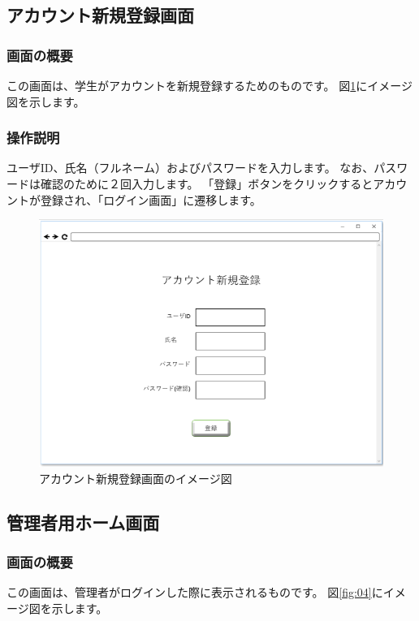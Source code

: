 \subsection{アカウント新規登録画面\label{creat_account}}
\subsubsection{画面の概要}
この画面は、学生がアカウントを新規登録するためのものです。
図\ref{fig:03}にイメージ図を示します。

\subsubsection{操作説明}
ユーザID、氏名（フルネーム）およびパスワードを入力します。
なお、パスワードは確認のために２回入力します。
「登録」ボタンをクリックするとアカウントが登録され、「ログイン画面」に遷移します。

\begin{figure}[htbp]
  \begin{center}
    \includegraphics[width=0.7\linewidth,clip]{./img/03.png}
    \caption{アカウント新規登録画面のイメージ図}\label{fig:03}
  \end{center}
\end{figure}

\newpage

\subsection{管理者用ホーム画面}
\subsubsection{画面の概要}
この画面は、管理者がログインした際に表示されるものです。
図\ref{fig:04}にイメージ図を示します。

